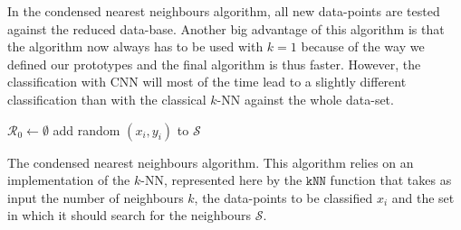 In the condensed nearest neighbours algorithm, all new data-points are tested against the reduced data-base. Another big advantage of this algorithm is that the algorithm now always has to be used with $k=1$ because of the way we defined our prototypes and the final algorithm is thus faster. However, the classification with CNN will most of the time lead to a slightly different classification than with the classical $k$-NN against the whole data-set.

\begin{center}
\begin{algorithm}[H]
\DontPrintSemicolon
{}

$\mathcal{R}_0 \leftarrow \emptyset$ \;
add random $\left(x_i, y_i\right)$ to $\mathcal{S}$ \;

\caption[The condensed nearest neighbors algorithm.]{The condensed nearest neighbours algorithm. This algorithm relies on an implementation of the $k$-NN, represented here by the $\mathtt{kNN}$ function that takes as input the number of neighbours $k$, the data-points to be classified $x_i$ and the set in which it should search for the neighbours $\mathcal{S}$.}
\label{alg:cnn}
\end{algorithm}
\end{center}